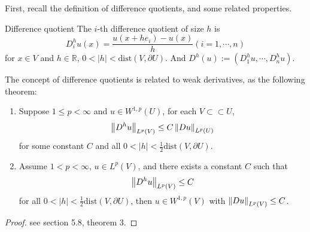 First, recall the definition of difference quotients, and some related properties.
\begin{definition}{Difference quotient}
    \label{def:diff_quo}
    The $i$-th difference quotient of size $h$ is 
    \begin{equation}
        \label{eq:diff_quo}
        D_{i}^{h}u(x)=\frac{u(x+he_{i})-u(x)}{h}(i=1,\cdots,n)
    \end{equation}
    for $x\in V$ and $h\in\mathbb{R}$, $0<|h|<\text{dist}(V,\partial U)$. And $D^{h}(u):=\left(D_{1}^{h}u,\cdots,D_{n}^{h}u\right)$.
\end{definition}
The concept of difference quotients is related to weak derivatives, as the following theorem:
\begin{theorem}
    \label{thm:diff_and_dir}
    \begin{enumerate}
        \item Suppose $1\le p<\infty$ and $u\in W^{1,p}(U)$, for each $V\subset\subset U$, 
        \begin{equation}
            \left\|D^{h}u\right\|_{L^{p}(V)}\le C\left\|Du\right\|_{L^{p}(U)}
        \end{equation}
        for some constant $C$ and all $0<|h|<\frac{1}{2}\text{dist}(V,\partial U).$
        \item Assume $1<p<\infty$, $u\in L^{p}(V)$, and there exists a constant $C$ such that 
        \begin{equation}
            \left\|D^{h}u\right\|_{L^{p}(V)}\le C
        \end{equation}
        for all $0<|h|<\frac{1}{2}\text{dist}(V,\partial U)$, then $u\in W^{1,p}(V)$ with $\left\|Du\right\|_{L^{p}(V)}\le C$.        
    \end{enumerate}
\end{theorem}
\begin{proof}
    see \cite{evans2022partial} section 5.8, theorem 3.
\end{proof}

